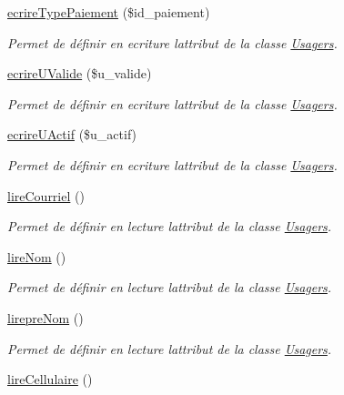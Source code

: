 \begin{DoxyCompactItemize}
\hyperlink{class_usagers_aa40ca40ce800d088ad78b61c42c59c20}{ecrire\+Type\+Paiement} (\$id\+\_\+paiement)
\begin{DoxyCompactList}\small\item\em Permet de définir en ecriture l\textquotesingle{}attribut de la classe \hyperlink{class_usagers}{Usagers}. \end{DoxyCompactList}\item 
\hyperlink{class_usagers_a206b9491cc65669d65b6f03c5439b26c}{ecrire\+U\+Valide} (\$u\+\_\+valide)
\begin{DoxyCompactList}\small\item\em Permet de définir en ecriture l\textquotesingle{}attribut de la classe \hyperlink{class_usagers}{Usagers}. \end{DoxyCompactList}\item 
\hyperlink{class_usagers_a459db0ebe1c831d00aaff9fc46fdfa45}{ecrire\+U\+Actif} (\$u\+\_\+actif)
\begin{DoxyCompactList}\small\item\em Permet de définir en ecriture l\textquotesingle{}attribut de la classe \hyperlink{class_usagers}{Usagers}. \end{DoxyCompactList}\item 
\hyperlink{class_usagers_a6a748b7883d25cd8e0d86f7668ae985c}{lire\+Courriel} ()
\begin{DoxyCompactList}\small\item\em Permet de définir en lecture l\textquotesingle{}attribut de la classe \hyperlink{class_usagers}{Usagers}. \end{DoxyCompactList}\item 
\hyperlink{class_usagers_a396be2eee626fc4f257948096a5b8fa0}{lire\+Nom} ()
\begin{DoxyCompactList}\small\item\em Permet de définir en lecture l\textquotesingle{}attribut de la classe \hyperlink{class_usagers}{Usagers}. \end{DoxyCompactList}\item 
\hyperlink{class_usagers_a8671a3cff3d5271fb635dd712396924b}{lirepre\+Nom} ()
\begin{DoxyCompactList}\small\item\em Permet de définir en lecture l\textquotesingle{}attribut de la classe \hyperlink{class_usagers}{Usagers}. \end{DoxyCompactList}\item 
\hyperlink{class_usagers_a181e8f6d45fd3a56b9eefa1435208799}{lire\+Cellulaire} ()

\end{DoxyCompactItemize}
